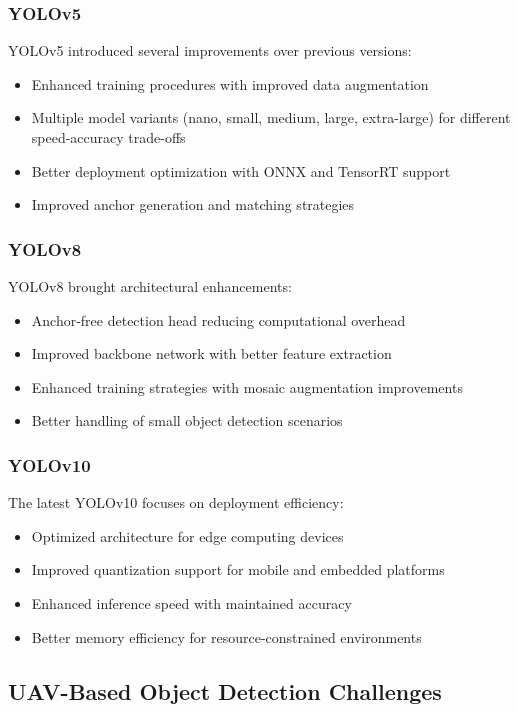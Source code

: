 \documentclass[11pt,a4paper]{article}
\begin{document}
\subsubsection{YOLOv5}
YOLOv5 introduced several improvements over previous versions:
\begin{itemize}
    \item Enhanced training procedures with improved data augmentation
    \item Multiple model variants (nano, small, medium, large, extra-large) for different speed-accuracy trade-offs
    \item Better deployment optimization with ONNX and TensorRT support
    \item Improved anchor generation and matching strategies
\end{itemize}

\subsubsection{YOLOv8}
YOLOv8 brought architectural enhancements:
\begin{itemize}
    \item Anchor-free detection head reducing computational overhead
    \item Improved backbone network with better feature extraction
    \item Enhanced training strategies with mosaic augmentation improvements
    \item Better handling of small object detection scenarios
\end{itemize}

\subsubsection{YOLOv10}
The latest YOLOv10 focuses on deployment efficiency:
\begin{itemize}
    \item Optimized architecture for edge computing devices
    \item Improved quantization support for mobile and embedded platforms
    \item Enhanced inference speed with maintained accuracy
    \item Better memory efficiency for resource-constrained environments
\end{itemize}

\subsection{UAV-Based Object Detection Challenges}
\end{document}
